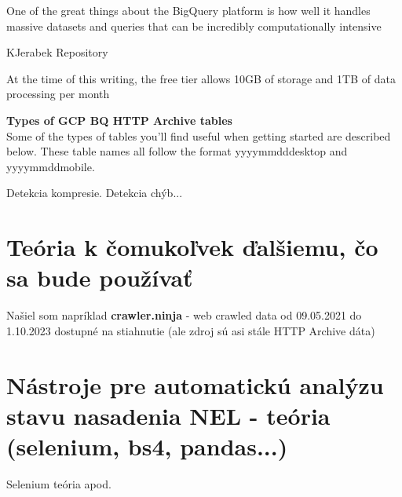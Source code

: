 One of the great things about the BigQuery platform is how well it handles massive datasets and queries that can be incredibly computationally intensive

KJerabek Repository

At the time of this writing, the free tier allows 10GB of storage and 1TB of data processing per month

\textbf{Types of GCP BQ HTTP Archive tables}
\\
Some of the types of tables you'll find useful when getting started are described below. These table names all follow the format yyyy\textunderscore mm\textunderscore dd\textunderscore desktop and yyyy\textunderscore mm\textunderscore dd\textunderscore mobile.

Detekcia kompresie. Detekcia chýb...

\section{Teória k čomukoľvek ďalšiemu, čo sa bude používať}

Našiel som napríklad \textbf{crawler.ninja} - web crawled data od 09.05.2021 do 1.10.2023 dostupné na stiahnutie (ale zdroj sú asi stále HTTP Archive dáta)

\section{Nástroje pre automatickú analýzu stavu nasadenia NEL - teória (selenium, bs4, pandas...)}

Selenium teória apod.
